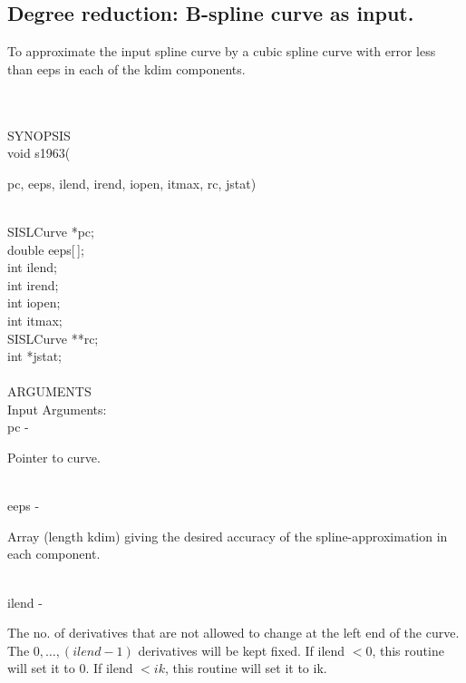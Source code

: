 \subsection{Degree reduction: B-spline curve as input.}
\begin{minipg1}
To approximate the input spline curve by a cubic spline
           curve with error less than eeps in each of the kdim components.
\end{minipg1} \\ \\
SYNOPSIS\\
        \> void s1963(\begin{minipg3}
            {\fov pc}, {\fov eeps}, {\fov ilend}, {\fov irend}, {\fov iopen}, {\fov itmax}, {\fov rc}, {\fov jstat})
                \end{minipg3}\\
                \>\>    SISLCurve    \>  *{\fov pc};\\
                \>\>    double \> {\fov eeps}[\,];\\
                \>\>    int    \>  {\fov ilend};\\
                \>\>    int    \>  {\fov irend};\\
                \>\>    int    \>  {\fov iopen};\\
                \>\>    int    \>  {\fov itmax};\\
                \>\>    SISLCurve    \>  **{\fov rc};\\
                \>\>    int    \>  *{\fov jstat};\\
\\
ARGUMENTS\\
	\>Input Arguments:\\
        \>\>    {\fov pc}\> - \>  \begin{minipg2}
                     Pointer to curve.
                               \end{minipg2}\\[0.8ex]
        \>\>    {\fov eeps}\> - \>  \begin{minipg2}
                     Array (length kdim) giving the desired accuracy of
                  the spline-approximation in each component.
                               \end{minipg2}\\[0.8ex]
        \>\>    {\fov ilend}\> - \>  \begin{minipg2}
                     The no. of derivatives that are not allowed to change
                 at the left end of the curve.
                 The $0,\ldots,(ilend-1)$ derivatives will be kept fixed.
                 If ilend $<0$, this routine will set it to 0.
                 If ilend $<ik$, this routine will set it to ik.
                               \end{minipg2}\\[0.8ex]
